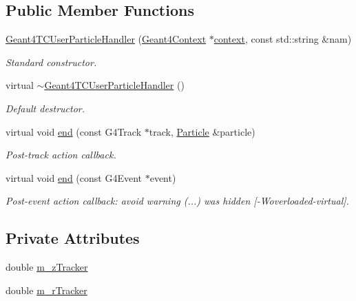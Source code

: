 \subsection*{Public Member Functions}
\begin{DoxyCompactItemize}
\item 
\hyperlink{class_d_d4hep_1_1_simulation_1_1_geant4_t_c_user_particle_handler_ab791641fc330c58512a0becaece51142}{Geant4\+T\+C\+User\+Particle\+Handler} (\hyperlink{class_d_d4hep_1_1_simulation_1_1_geant4_context}{Geant4\+Context} $\ast$\hyperlink{class_d_d4hep_1_1_simulation_1_1_geant4_action_aa9d87f0ec2a72b7fc2591b18f98d75cf}{context}, const std\+::string \&nam)
\begin{DoxyCompactList}\small\item\em Standard constructor. \end{DoxyCompactList}\item 
virtual \hyperlink{class_d_d4hep_1_1_simulation_1_1_geant4_t_c_user_particle_handler_adcf43ca266894019172cb24712daa9d0}{$\sim$\+Geant4\+T\+C\+User\+Particle\+Handler} ()
\begin{DoxyCompactList}\small\item\em Default destructor. \end{DoxyCompactList}\item 
virtual void \hyperlink{class_d_d4hep_1_1_simulation_1_1_geant4_t_c_user_particle_handler_a1578be1e99f7f70c9d332cffb1ad2504}{end} (const G4\+Track $\ast$track, \hyperlink{class_d_d4hep_1_1_simulation_1_1_geant4_user_particle_handler_a0222f326d539ff27c6c446a7a30e8e26}{Particle} \&particle)
\begin{DoxyCompactList}\small\item\em Post-\/track action callback. \end{DoxyCompactList}\item 
virtual void \hyperlink{class_d_d4hep_1_1_simulation_1_1_geant4_t_c_user_particle_handler_ac51009a6e712d2b52d2470a5a1a7a03d}{end} (const G4\+Event $\ast$event)
\begin{DoxyCompactList}\small\item\em Post-\/event action callback\+: avoid warning (...) was hidden \mbox{[}-\/\+Woverloaded-\/virtual\mbox{]}. \end{DoxyCompactList}\end{DoxyCompactItemize}
\subsection*{Private Attributes}
\begin{DoxyCompactItemize}
\item 
double \hyperlink{class_d_d4hep_1_1_simulation_1_1_geant4_t_c_user_particle_handler_a79695432f91c1c1d7430f26e6a365a40}{m\+\_\+z\+Tracker}
\item 
double \hyperlink{class_d_d4hep_1_1_simulation_1_1_geant4_t_c_user_particle_handler_a243303fc54a7945531d49aa1a0eeca7d}{m\+\_\+r\+Tracker}
\end{DoxyCompactItemize}
